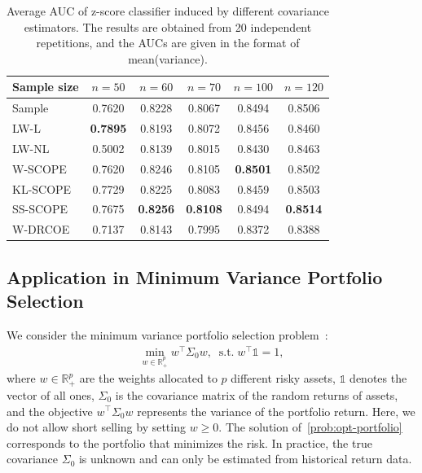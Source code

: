 \documentclass[11pt]{article}
\def\R{\mathbb{R}}
\def\st{\text{s.t.}}
\def\transpose{\top}
\def\R{\mathbb{R}}
\begin{document}
\begin{table}[H]
\centering
\begin{tabular}{lccccc}
\hline
Sample size & $n=50$ & $n=60$ & $n=70$ & $n=100$ & $n=120$ \\ \hline
Sample & 0.7620 &0.8228 & 0.8067 & 0.8494 & 0.8506 \\ 
LW-L & \textbf{0.7895} &0.8193 & 0.8072 & 0.8456 & 0.8460 \\ 
LW-NL & 0.5002 & 0.8139 & 0.8015 & 0.8430 & 0.8463 \\ 
W-SCOPE & 0.7620 &0.8246 & 0.8105 & \textbf{0.8501} & 0.8502 \\ 
KL-SCOPE & 0.7729 &0.8225 & 0.8083 & 0.8459 & 0.8503 \\ 
SS-SCOPE & 0.7675 &\textbf{0.8256} & \textbf{0.8108} & 0.8494 & \textbf{0.8514} \\ 
W-DRCOE &0.7137 &0.8143 & 0.7995 &0.8372  & 0.8388 \\ \hline
\end{tabular}
\caption{Average AUC of z-score classifier induced by different covariance estimators. The results are obtained from 20 independent repetitions, and the AUCs are given in the format of mean(variance).}\label{tab:ab-test-AUC}
\end{table}

\subsection{Application in Minimum Variance Portfolio Selection}
We consider the minimum variance portfolio selection problem~\cite{ref:jagannathan2003risk}:
\begin{align}\label{prob:opt-portfolio}
    \min_{w\in\R_+^p} w^\transpose \Sigma_0 w, \;\;\st\; w^\transpose \mathds{1} = 1, 
\end{align}
where $w\in \R_+^p$ are the weights allocated to $p$ different risky assets, $\mathds{1}$ denotes the vector of all ones, $\Sigma_0$ is the covariance matrix of the random returns of assets, and the objective $w^\transpose \Sigma_0 w$ represents the variance of the portfolio return. Here, we do not allow short selling by setting $w\geq 0$. The solution of~\eqref{prob:opt-portfolio} corresponds to the portfolio that minimizes the risk. In practice, the true covariance $\Sigma_0$ is unknown and can only be estimated from historical return data. 
\end{document}
